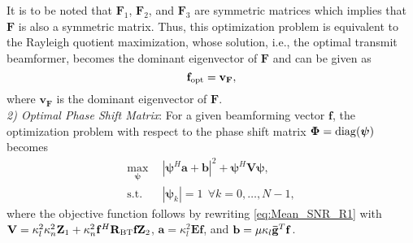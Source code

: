 \documentclass[journal,draftclsnofoot,onecolumn,12pt]{IEEEtran}
\begin{document}
It is to be noted that  $\mathbf{F}_1$, $\mathbf{F}_2$, and $\mathbf{F}_3$ are symmetric matrices which implies that $\mathbf{F}$ is also a symmetric matrix. Thus, this optimization problem is equivalent to the Rayleigh quotient maximization, whose solution, i.e., the optimal transmit beamformer, becomes the dominant eigenvector of $\mathbf{F}$ and can be given as 
    \begin{equation}
        \mathbf{f}_{\rm opt} = \mathbf{v_F},\label{OptSol_f_R1}
    \end{equation}
where $\mathbf{v_F}$ is the dominant eigenvector of $\mathbf{F}$.\\
\emph{2) Optimal Phase Shift Matrix}: For a given beamforming vector $\mathbf{f}$, the optimization problem with respect to the phase shift matrix $\mathbf{\Phi} = \rm{diag}(\boldsymbol{\psi})$ becomes
\begin{subequations}
\begin{align}
    \max_{\boldsymbol{\psi}}  ~~& |\boldsymbol{\psi}^H\mathbf{a}+\mathbf{b}|^2 + \boldsymbol{\psi}^H\mathbf{V}\boldsymbol{\psi} \label{subprob_phi_R1},\\
   \text{s.t.} ~~& |\boldsymbol{\psi}_k| = 1 ~~ \forall k = 0,\ldots,N-1,\label{constraint_psi}
\end{align}\label{prob psi}%
\end{subequations}
where the objective function follows by rewriting \eqref{eq:Mean_SNR_R1} with $\mathbf{V}=\kappa_l^2\kappa_n^2\mathbf{Z}_1+\kappa_n^2\mathbf{f}^H\mathbf{R}_{\rm BT}\mathbf{f}\mathbf{Z}_2$, $ \mathbf{a}=\kappa_l^2\mathbf{Ef}$, and $\mathbf{b}= \mu\kappa_l\mathbf{\Bar{g}}^T\mathbf{f}$. %
\end{document}
